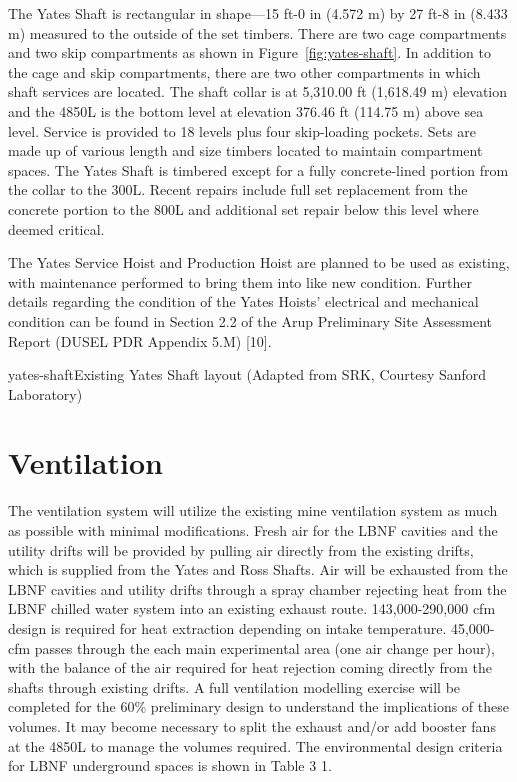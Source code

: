 The Yates Shaft is rectangular in shape—15 ft-0 in (4.572 m) by 27 ft-8 in (8.433 m) measured to the outside of the set timbers. There are two cage compartments and two skip compartments as shown in Figure~\ref{fig:yates-shaft}. In addition to the cage and skip compartments, there are two other compartments in which shaft services are located. The shaft collar is at 5,310.00 ft (1,618.49 m) elevation and the 4850L is the bottom level at elevation 376.46 ft (114.75 m) above sea level. Service is provided to 18 levels plus four skip-loading pockets. Sets are made up of various length and size timbers located to maintain compartment spaces. The Yates Shaft is timbered except for a fully concrete-lined portion from the collar to the 300L. Recent repairs include full set replacement from the concrete portion to the 800L and additional set repair below this level where deemed critical.

The Yates Service Hoist and Production Hoist are planned to be used as existing, with maintenance performed to bring them into like new condition. Further details regarding the condition of the Yates Hoists' electrical and mechanical condition can be found in Section 2.2 of the Arup Preliminary Site Assessment Report (DUSEL PDR Appendix 5.M) [10].

\begin{cdrfigure}{yates-shaft}{Existing Yates Shaft layout (Adapted from SRK, Courtesy Sanford Laboratory)}
\end{cdrfigure}



\section{Ventilation}
\label{sec:fscf-und-vent}

The ventilation system will utilize the existing mine ventilation system as much as possible with minimal modifications. Fresh air for the LBNF cavities and the utility drifts will be provided by pulling air directly from the existing drifts, which is supplied from the Yates and Ross Shafts. Air will be exhausted from the LBNF cavities and utility drifts through a spray chamber rejecting heat from the LBNF chilled water system into an existing exhaust route. 143,000-290,000 cfm design is required for heat extraction depending on intake temperature. 45,000-cfm passes through the each main experimental area (one air change per hour), with the balance of the air required for heat rejection coming directly from the shafts through existing drifts. A full ventilation modelling exercise will be completed for the 60\% preliminary design to understand the implications of these volumes.  It may become necessary to split the exhaust and/or add booster fans at the 4850L to manage the volumes required. The environmental design criteria for LBNF underground spaces is shown in Table 3 1.

